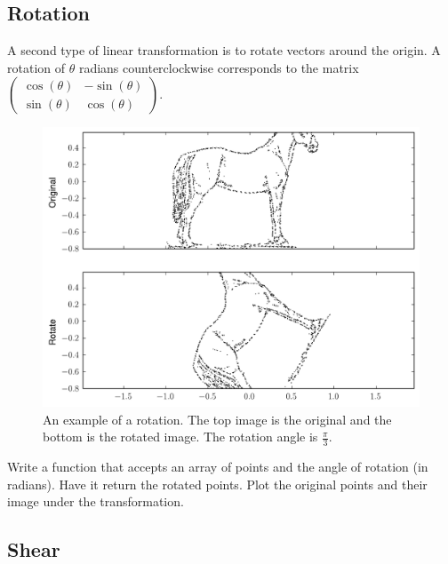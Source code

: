 \subsection*{Rotation}
A second type of linear transformation is to rotate vectors around the origin. A rotation of $\theta$ radians counterclockwise corresponds to the matrix $\begin{pmatrix}
\cos(\theta) & -\sin(\theta) \\
\sin(\theta) & \cos(\theta)
\end{pmatrix}.$

\begin{figure}
\includegraphics[width=\textwidth]{rotate.pdf}
\caption{An example of a rotation.
The top image is the original and the bottom is the rotated image.
The rotation angle is $\frac{\pi}{3}$.}
\label{basis:rotate}
\end{figure}

\begin{problem}
Write a function that accepts an array of points and the angle of rotation (in radians). Have it return the rotated points.
Plot the original points and their image under the transformation.
\end{problem}

\subsection*{Shear}

